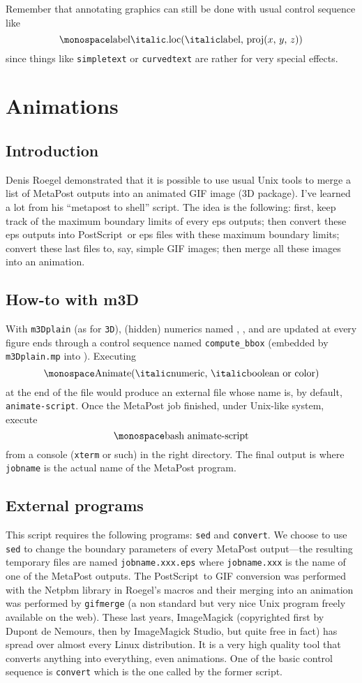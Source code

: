 \remark
Remember that annotating graphics can still be done with usual control
sequence like
$$
\cs{label{\it.loc}({\it label}, proj($x$, $y$, $z$))}
$$
since things like {\tt simpletext} or {\tt curvedtext}
are rather for very special effects.
\endremark

\section{Animations}

\subsection{Introduction}
Denis Roegel demonstrated that it is possible to use usual Unix tools
to merge a list of MetaPost outputs into an animated GIF image (3D package).
I've learned a lot from his ``metapost to shell'' script. The idea is the following: first, keep track of the maximum boundary limits of every eps outputs; then convert these eps outputs into PostScript\TM\ or eps files with these maximum boundary limits; convert these last files to, say, simple GIF images; then merge all these images into an animation.

\subsection{How-to with m3D}
With {\tt m3Dplain} (as for {\tt 3D}), (hidden) numerics named
, ,  and  are updated
at every figure ends through a control sequence named {\tt compute\_bbox}
(embedded by {\tt m3Dplain.mp} into ). Executing
$$
\hbox{\tt Animate({\it numeric}, {\it boolean or color})}
$$
at the end of the file would produce an external file whose name is,
by default, {\tt animate-script}. 
Once the MetaPost job finished, under Unix-like system, execute
$$
	\hbox{\tt bash animate-script}
$$
from a console ({\tt xterm} or such) in the right directory. The final
output is  where {\tt jobname} is the actual name of the MetaPost program.

\subsection{External programs}
This script requires the following programs: {\tt sed} and {\tt convert}.
We choose to use {\tt sed} to change the boundary parameters of every MetaPost output---the resulting temporary files are named {\tt jobname.xxx.eps} where {\tt jobname.xxx} is the name of one of the MetaPost outputs. The PostScript\TM\ to GIF conversion was performed with the Netpbm library in Roegel's macros and their merging into an animation was performed by {\tt gifmerge} (a non standard but very nice Unix program freely available on the web). These last years, ImageMagick (copyrighted first by Dupont de Nemours, then by ImageMagick Studio, but quite free in fact) has spread over almost every Linux distribution. It is a very high quality tool that converts anything into everything, even animations. One of the basic control sequence is {\tt convert} which is the one called by the former script.

